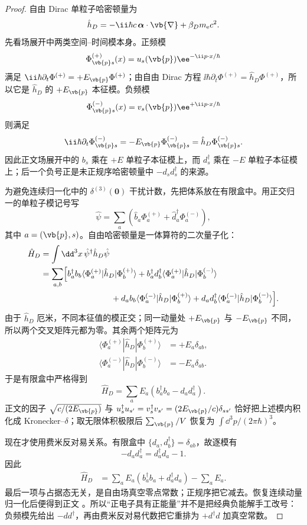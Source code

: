 \begin{proof}
自由 Dirac 单粒子哈密顿量为
\[
 \hat h_D=-\ii\hbar c\,\boldsymbol\alpha\cdot\vb{\nabla}
 +\beta_Dm_{\mathrm e} c^2.
\]
先看场展开中两类空间--时间模本身。正频模
\[
 \Phi^{(+)}_{\vb{p} s}(x)
 =u_s(\vb{p})\ee^{-\ii p\cdot x/\hbar}
\]
满足 $\ii\hbar\partial_t\Phi^{(+)}=+E_{\vb{p}}\Phi^{(+)}$；由自由 Dirac 方程
$\ii\hbar\partial_t\Phi^{(+)}=\hat h_D\Phi^{(+)}$，所以它是 $\hat h_D$ 的 $+E_{\vb{p}}$ 本征模。负频模
\[
 \Phi^{(-)}_{\vb{p} s}(x)
 =v_s(\vb{p})\ee^{+\ii p\cdot x/\hbar}
\]
则满足
\[
 \ii\hbar\partial_t\Phi^{(-)}_{\vb{p} s}
 =-E_{\vb{p}}\Phi^{(-)}_{\vb{p} s}
 =\hat h_D\Phi^{(-)}_{\vb{p} s}.
\]
因此正文场展开中的 $b_s$ 乘在 $+E$ 单粒子本征模上，而 $d_s^\dagger$ 乘在 $-E$ 单粒子本征模上；后一个负号正是未正规序哈密顿量中
$-d_sd_s^\dagger$ 的来源。

为避免连续归一化中的 $\delta^{(3)}(\mathbf0)$ 干扰计数，先把体系放在有限盒中。用正交归一的单粒子模记号写
\[
 \hat\psi
 =\sum_a\left(
 \hat b_a\Phi_a^{(+)}+\hat d_a^\dagger\Phi_a^{(-)}
 \right),
\]
其中 $a=(\vb{p},s)$。自由哈密顿量是一体算符的二次量子化：
\begin{align*}
 \hat H_D
 &=\int\dd^3x\,\hat\psi^\dagger\hat h_D\hat\psi\\
 &=\sum_{a,b}\Bigl[
 b_a^\dagger b_b\langle\Phi_a^{(+)}|\hat h_D|\Phi_b^{(+)}\rangle
 +b_a^\dagger d_b^\dagger\langle\Phi_a^{(+)}|\hat h_D|\Phi_b^{(-)}\rangle\\
 &\hspace{30mm}
 +d_a b_b\langle\Phi_a^{(-)}|\hat h_D|\Phi_b^{(+)}\rangle
 +d_a d_b^\dagger\langle\Phi_a^{(-)}|\hat h_D|\Phi_b^{(-)}\rangle
 \Bigr].
\end{align*}
由于 $\hat h_D$ 厄米，不同本征值的模正交；同一动量处 $+E_{\vb{p}}$ 与 $-E_{\vb{p}}$ 不同，所以两个交叉矩阵元都为零。其余两个矩阵元为
\begin{align*}
 \langle\Phi_a^{(+)}|\hat h_D|\Phi_b^{(+)}\rangle
 &=+E_a\delta_{ab},\\
 \langle\Phi_a^{(-)}|\hat h_D|\Phi_b^{(-)}\rangle
 &=-E_a\delta_{ab}.
\end{align*}
于是有限盒中严格得到
\begin{equation*}
 \hat H_D=\sum_a E_a
 \left(b_a^\dagger b_a-d_a d_a^\dagger\right).
\end{equation*}
正文的因子 $\sqrt{c/(2E_{\vb{p}})}$ 与
$u_s^\dagger u_{s'}=v_s^\dagger v_{s'}=(2E_{\vb{p}}/c)\delta_{ss'}$
恰好把上述模内积化成 Kronecker--$\delta$；取无限体积极限后
$\sum_{\vb{p}}/V$ 恢复为 $\int\dd^3p/(2\pi\hbar)^3$。

现在才使用费米反对易关系。有限盒中
$\{d_a,d_b^\dagger\}=\delta_{ab}$，故逐模有
\[
 -d_ad_a^\dagger=d_a^\dagger d_a-1.
\]
因此
\begin{align*}
 \hat H_D
 &=\sum_aE_a\left(b_a^\dagger b_a+d_a^\dagger d_a\right)
 -\sum_aE_a.
\end{align*}
最后一项与占据态无关，是自由场真空零点常数；正规序把它减去。恢复连续动量归一化后便得到正文
。所以“正电子具有正能量”并不是把经典负能解手工改号：负频模先给出 $-d d^\dagger$，再由费米反对易代数把它重排为 $+d^\dagger d$ 加真空常数。
\end{proof}



